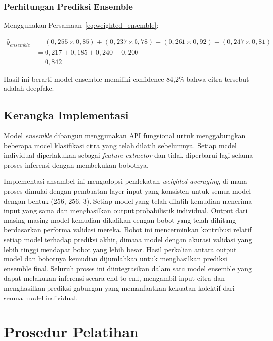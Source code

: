 \subsubsection{Perhitungan Prediksi Ensemble}
Menggunakan Persamaan~\ref{eq:weighted_ensemble}:

\begin{align}
\hat{y}_{ensemble} &= (0,255 \times 0,85) + (0,237 \times 0,78) + (0,261 \times 0,92) + (0,247 \times 0,81) \\
&= 0,217 + 0,185 + 0,240 + 0,200 \\
&= 0,842
\end{align}

Hasil ini berarti model ensemble memiliki confidence 84,2\% bahwa citra tersebut adalah deepfake.

\subsection{Kerangka Implementasi}

Model \textit{ensemble} dibangun menggunakan API fungsional untuk menggabungkan beberapa model klasifikasi citra yang telah dilatih sebelumnya. Setiap model individual diperlakukan sebagai \textit{feature extractor} dan tidak diperbarui lagi selama proses inferensi dengan membekukan bobotnya.

Implementasi ansambel ini mengadopsi pendekatan \textit{weighted averaging}, di mana proses dimulai dengan pembuatan layer input yang konsisten untuk semua model dengan bentuk (256, 256, 3). Setiap model yang telah dilatih kemudian menerima input yang sama dan menghasilkan output probabilistik individual. Output dari masing-masing model kemudian dikalikan dengan bobot yang telah dihitung berdasarkan performa validasi mereka. Bobot ini mencerminkan kontribusi relatif setiap model terhadap prediksi akhir, dimana model dengan akurasi validasi yang lebih tinggi mendapat bobot yang lebih besar. Hasil perkalian antara output model dan bobotnya kemudian dijumlahkan untuk menghasilkan prediksi ensemble final. Seluruh proses ini diintegrasikan dalam satu model ensemble yang dapat melakukan inferensi secara end-to-end, mengambil input citra dan menghasilkan prediksi gabungan yang memanfaatkan kekuatan kolektif dari semua model individual.

\section{Prosedur Pelatihan}

